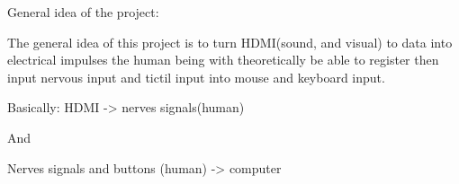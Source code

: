General idea of the project:

The general idea of this project is to turn HDMI(sound, and visual) to data into electrical impulses the human being with theoretically be able to register then input nervous input and tictil input into mouse and keyboard input.

Basically:
 HDMI -> nerves signals(human)

And

Nerves signals 
and buttons    (human)  -> computer